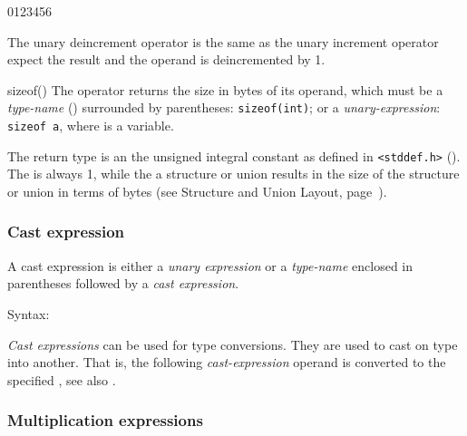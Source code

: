 \begin{production}
\begin{Ventry3}{0123456}
\item[\T{--}]   The unary deincrement operator is the same as the unary 
                increment operator expect the result and the operand is
        deincremented by 1.

\item[sizeof()]  The  operator returns the size
        in bytes of its operand, which must be a {\it type-name}
        () surrounded by parentheses:
        \verb+sizeof(int)+; or a {\it unary-expression}:
        \verb+sizeof a+, where  is a variable.

        The return type is an the unsigned integral constant
         as defined in \verb+<stddef.h>+
        ().  The  is always 1, while
        the  a structure or union results in the size of the
        structure or union in terms of bytes (see Structure and Union
        Layout, page~\pageref{StructureUnionLayout}).
 
\end{Ventry3}
\end{production}

\subsubsection{Cast expression}
\label{sec:CastExpression}

A cast expression is either a {\it unary expression} or a {\it
type-name} enclosed in parentheses followed by a {\it cast
expression}.

Syntax:

\begin{production}
\end{production}

{\it Cast expressions} can be used for type conversions. They are used
to cast on type into another.  That is, the following {\it
cast-expression} operand is converted to the specified
, see also .

\subsubsection{Multiplication expressions}
\label{sec:MultExpression}

